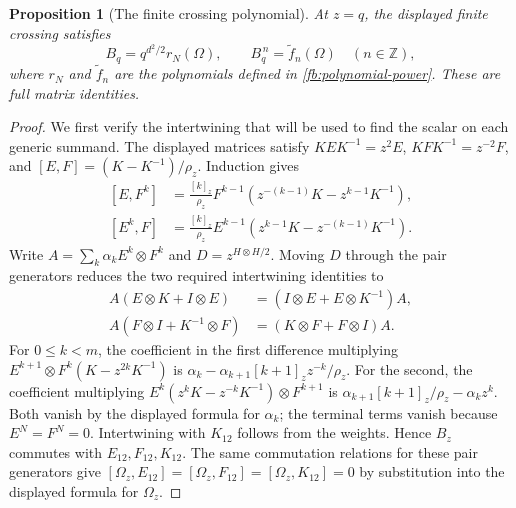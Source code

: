 \documentclass[11pt]{article}
\numberwithin{equation}{section}
\newtheorem{proposition}[theorem]{Proposition}
\theoremstyle{definition}\newtheorem{definition}[theorem]{Definition}
\theoremstyle{remark}\newtheorem{remark}[theorem]{Remark}
\begin{document}
\begin{proposition}[The finite crossing polynomial]\label{fb:crossing-polynomial}
At $z=q$, the displayed finite crossing satisfies
\[
 B_q=q^{d^2/2}r_N(\Omega),\qquad
 B_q^{\,n}=\widetilde f_n(\Omega)\quad(n\in\mathbb Z),
\]
where $r_N$ and $\widetilde f_n$ are the polynomials defined in
\eqref{fb:polynomial-power}. These are full matrix identities.
\end{proposition}

\begin{proof}
We first verify the intertwining that will be used to find the scalar
on each generic summand. The displayed matrices satisfy
$KEK^{-1}=z^2E$, $KFK^{-1}=z^{-2}F$, and
$[E,F]=(K-K^{-1})/\rho_z$. Induction gives
\[
\begin{split}
 [E,F^k]&=\frac{[k]_z}{\rho_z}
       F^{k-1}(z^{-(k-1)}K-z^{k-1}K^{-1}),\\
 [E^k,F]&=\frac{[k]_z}{\rho_z}
       E^{k-1}(z^{k-1}K-z^{-(k-1)}K^{-1}).
\end{split}
\]
Write $A=\sum_k\alpha_k E^k\otimes F^k$ and
$D=z^{H\otimes H/2}$. Moving $D$ through the pair generators reduces
the two required intertwining identities to
\[
\begin{split}
 A(E\otimes K+I\otimes E)&=(I\otimes E+E\otimes K^{-1})A,\\
 A(F\otimes I+K^{-1}\otimes F)&=(K\otimes F+F\otimes I)A.
\end{split}
\]
For $0\le k<m$, the coefficient in the first difference multiplying
$E^{k+1}\otimes F^k(K-z^{2k}K^{-1})$ is
$\alpha_k-\alpha_{k+1}[k+1]_zz^{-k}/\rho_z$.
For the second, the coefficient multiplying
$E^k(z^kK-z^{-k}K^{-1})\otimes F^{k+1}$ is
$\alpha_{k+1}[k+1]_z/\rho_z-\alpha_kz^k$.
Both vanish by the displayed formula for $\alpha_k$; the terminal
terms vanish because $E^N=F^N=0$. Intertwining with $K_{12}$ follows
from the weights. Hence $B_z$ commutes with $E_{12},F_{12},K_{12}$.
The same commutation relations for these pair generators give
$[\Omega_z,E_{12}]=[\Omega_z,F_{12}]=[\Omega_z,K_{12}]=0$ by
substitution into the displayed formula for $\Omega_z$.


\end{proof}
\end{document}
